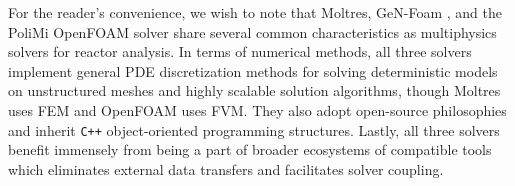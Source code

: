 For the reader's convenience, we wish to note that Moltres, GeN-Foam
\cite{fiorina_gen-foam_2015}, and the PoliMi OpenFOAM solver
\cite{aufiero_development_2014} share several common characteristics as
multiphysics solvers for reactor analysis. In terms of numerical methods, all
three solvers implement general \gls{PDE} discretization methods for solving
deterministic models on unstructured meshes and highly scalable solution
algorithms, though Moltres uses \gls{FEM} and OpenFOAM uses \gls{FVM}. They
also adopt open-source philosophies and inherit \texttt{C++}
object-oriented programming structures. Lastly, all
three solvers benefit immensely from being a part of broader ecosystems of
compatible tools which eliminates external data
transfers and facilitates solver coupling.
